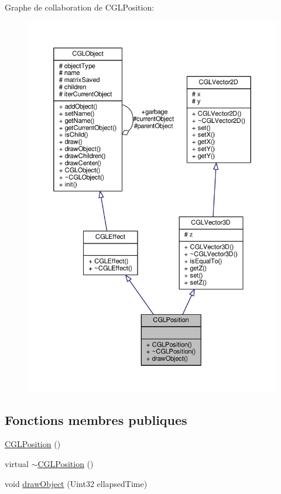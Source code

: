 Graphe de collaboration de C\-G\-L\-Position\-:
\nopagebreak
\begin{figure}[H]
\begin{center}
\leavevmode
\includegraphics[width=350pt]{df/df1/class_c_g_l_position__coll__graph}
\end{center}
\end{figure}
\subsection*{Fonctions membres publiques}
\begin{DoxyCompactItemize}
\item 
\hyperlink{class_c_g_l_position_ab32bdd49fc31414e874917568e5d37d2}{C\-G\-L\-Position} ()
\item 
virtual \hyperlink{class_c_g_l_position_afe1ee045b528494d23286adf06aecae0}{$\sim$\-C\-G\-L\-Position} ()
\item 
void \hyperlink{class_c_g_l_position_a439ae873ba7ef56826a27eb7b15b0b6f}{draw\-Object} (Uint32 ellapsed\-Time)
\end{DoxyCompactItemize}
